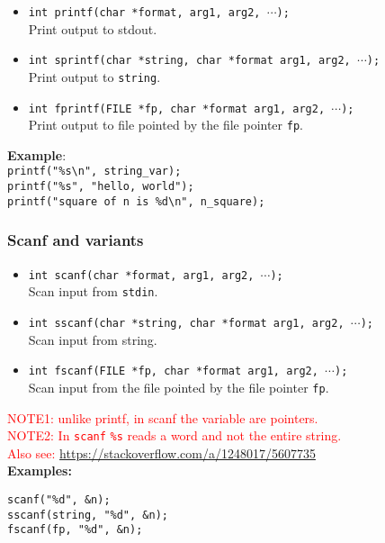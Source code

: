 \begin{itemize}
\item \texttt{int printf(char *format, arg1, arg2, $\cdots$);}\\
Print output to stdout.
\item \texttt{int sprintf(char *string, char *format arg1, arg2, $\cdots$);}\\
Print output to \texttt{string}.
\item \texttt{int fprintf(FILE *fp, char *format arg1, arg2, $\cdots$);}\\
Print output to file pointed by the file pointer \texttt{fp}.
\end{itemize}

\textbf{Example}:\\
\texttt{printf("\%s\textbackslash n", string\_var);}\\
\texttt{printf("\%s", "hello, world");}\\
\texttt{printf("square of n is \%d\textbackslash n", n\_square);}\\

\subsubsection{Scanf and variants}

\begin{itemize}
\item \texttt{int scanf(char *format, arg1, arg2, $\cdots$);}\\
Scan input from \texttt{stdin}.
\item \texttt{int sscanf(char *string, char *format arg1, arg2, $\cdots$);}\\
Scan input from string.
\item \texttt{int fscanf(FILE *fp, char *format arg1, arg2, $\cdots$);}\\
Scan input from the file pointed by the file pointer \texttt{fp}.
\end{itemize}

\textcolor{red}{NOTE1: unlike printf, in scanf the variable are pointers.}\\
\textcolor{red}{NOTE2: In \texttt{scanf} \texttt{\%s} reads a word and not the entire string.}\\
\textcolor{red}{Also see:} \textcolor{blue}{\url{https://stackoverflow.com/a/1248017/5607735}}\\

\textbf{Examples:}
\vspace{-6pt}
\begin{verbatim}
scanf("%d", &n);	
sscanf(string, "%d", &n);	
fscanf(fp, "%d", &n);	
\end{verbatim}

